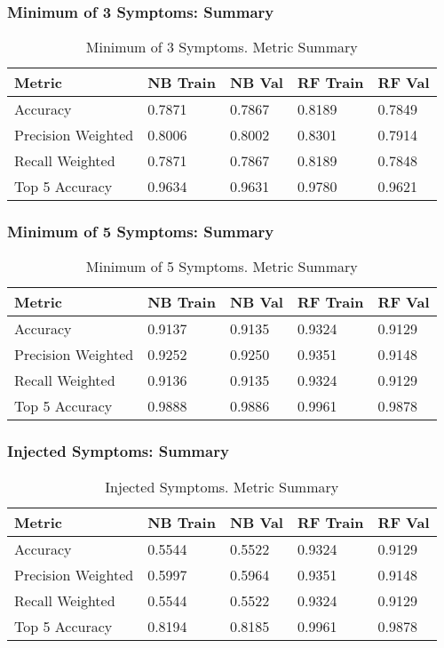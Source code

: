 \documentclass{beamer}
\begin{document}
\begin{frame}
\frametitle{Minimum of 3 Symptoms: Summary }
\begin{table}[]
	\begin{tabular}{|l|l|l|l|l|}
		\hline
		Metric             & NB Train & NB Val & RF Train  & RF Val \\ \hline
		Accuracy         & 0.7871 & 0.7867  & 0.8189 & 0.7849    \\ \hline
		Precision Weighted & 0.8006 &  0.8002 &0.8301 &0.7914    \\ \hline
		Recall Weighted     & 0.7871 & 0.7867 & 0.8189 & 0.7848    \\ \hline
		Top 5 Accuracy      &0.9634 & 0.9631 &0.9780 &  0.9621    \\ \hline
	\end{tabular}
	\caption{Minimum of 3 Symptoms. Metric Summary}
	\label{table:tab_5}
\end{table}
\end{frame}

\begin{frame}
\frametitle{Minimum of 5 Symptoms: Summary }
\begin{table}[]
	\begin{tabular}{|l|l|l|l|l|}
		\hline
		Metric             & NB Train & NB Val & RF Train  & RF Val \\ \hline
		Accuracy         &0.9137 & 0.9135  & 0.9324 & 0.9129   \\ \hline
		Precision Weighted & 0.9252 &  0.9250 &0.9351 &0.9148   \\ \hline
		Recall Weighted     &  0.9136 &0.9135 & 0.9324 & 0.9129   \\ \hline
		Top 5 Accuracy      &0.9888 & 0.9886 &0.9961 &  0.9878   \\ \hline
	\end{tabular}
	\caption{Minimum of 5 Symptoms. Metric Summary}
	\label{table:tab_6}
\end{table}
\end{frame}

\begin{frame}
\frametitle{Injected Symptoms: Summary }
\begin{table}[]
	\begin{tabular}{|l|l|l|l|l|}
		\hline
		Metric             & NB Train & NB Val & RF Train  & RF Val \\ \hline
		Accuracy         &0.5544 &0.5522 & 0.9324 & 0.9129   \\ \hline
		Precision Weighted & 0.5997 &  0.5964 &0.9351 &0.9148   \\ \hline
		Recall Weighted     &  0.5544 &0.5522& 0.9324 & 0.9129   \\ \hline
		Top 5 Accuracy      &0.8194 & 0.8185 &0.9961 &  0.9878   \\ \hline
	\end{tabular}
	\caption{Injected Symptoms. Metric Summary}
	\label{table:tab_7}
\end{table}
\end{frame}
\end{document}
